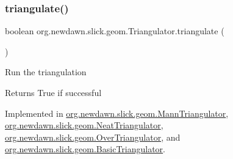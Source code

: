 \mbox{\label{interfaceorg_1_1newdawn_1_1slick_1_1geom_1_1_triangulator_a7c7ce8f59679b6c759a1e3d15ec4ee92}} 
\subsubsection{\texorpdfstring{triangulate()}{triangulate()}}
{\footnotesize\ttfamily boolean org.\+newdawn.\+slick.\+geom.\+Triangulator.\+triangulate (\begin{DoxyParamCaption}{ }\end{DoxyParamCaption})}

Run the triangulation

\begin{DoxyReturn}{Returns}
True if successful 
\end{DoxyReturn}


Implemented in \mbox{\hyperlink{classorg_1_1newdawn_1_1slick_1_1geom_1_1_mann_triangulator_a14301dcfbddc186d4e24dba24dba2535}{org.\+newdawn.\+slick.\+geom.\+Mann\+Triangulator}}, \mbox{\hyperlink{classorg_1_1newdawn_1_1slick_1_1geom_1_1_neat_triangulator_a32227a64f0e7142d40d79a1adb3fdb24}{org.\+newdawn.\+slick.\+geom.\+Neat\+Triangulator}}, \mbox{\hyperlink{classorg_1_1newdawn_1_1slick_1_1geom_1_1_over_triangulator_aabce5b7a47ea28da8332d0d3c546269b}{org.\+newdawn.\+slick.\+geom.\+Over\+Triangulator}}, and \mbox{\hyperlink{classorg_1_1newdawn_1_1slick_1_1geom_1_1_basic_triangulator_ab83576d3940583b73bf3224acacf4e48}{org.\+newdawn.\+slick.\+geom.\+Basic\+Triangulator}}.

